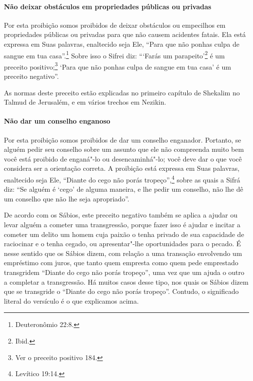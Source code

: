 \begin{multicols}{2}
\paragraph{Não deixar obstáculos em propriedades públicas ou privadas}

Por esta proibição somos proibidos de deixar obstáculos ou empecilhos
em propriedades públicas ou privadas para que não causem acidentes
fatais. Ela está expressa em Suas palavras, enaltecido seja Ele, ``Para
que não ponhas culpa de sangue em tua casa''.\footnote{Deuteronômio 22:8.} Sobre
isso o Sifrei\starr{} diz: ```Farás um parapeito'\footnote{Ibid.} é um preceito
positivo;\footnote{Ver o preceito positivo 184.} `Para que não ponhas culpa de sangue em
tua casa' é um preceito negativo''.

As normas deste preceito estão explicadas no primeiro capítulo de
Shekalim\starr{} no Talmud\starr{} de Jerusalém, e em vários trechos em Nezikin\starr.

\paragraph{Não dar um conselho enganoso}

Por esta proibição somos proibidos de dar um conselho enganador.
Portanto, se alguém pedir seu conselho sobre um assunto que ele não
compreenda muito bem você está proibido de enganá"-lo ou desencaminhá"-lo;
você deve dar o que você considera ser a orientação correta. A proibição
está expressa em Suas palavras, enaltecido seja Ele, ``Diante do cego
não porás tropeço'',\footnote{Levítico 19:14.} sobre as quais a Sifrá\starr{} diz: ``Se
alguém é `cego' de alguma maneira, e lhe pedir um conselho, não lhe dê
um conselho que não lhe seja apropriado''.

De acordo com os Sábios, este preceito negativo também se aplica a
ajudar ou levar alguém a cometer uma transgressão, porque fazer isso é
ajudar e incitar a cometer um delito um homem cuja paixão o tenha
privado de sua capacidade de raciocinar e o tenha cegado, ou
apresentar"-lhe oportunidades para o pecado. É nesse sentido que os
Sábios dizem, com relação a uma transação envolvendo um empréstimo com
juros, que tanto quem empresta como quem pede emprestado transgridem
``Diante do cego não porás tropeço'', uma vez que um ajuda o outro a
completar a transgressão. Há muitos casos desse tipo, nos quais os
Sábios dizem que se transgride o ``Diante do cego não porás tropeço''.
Contudo, o significado literal do versículo é o que explicamos acima.


\end{multicols}
